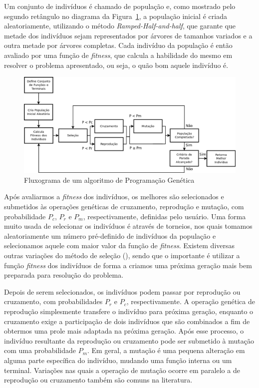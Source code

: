 Um conjunto de indivíduos é chamado de população e, como mostrado pelo segundo retângulo no diagrama da Figura~\ref{fig::gpwf}, a população inicial é criada aleatoriamente, utilizando o método \textit{Ramped-Half-and-half}, que garante que metade dos indivíduos sejam representados por árvores de tamanhos variados e a outra metade por árvores completas.
Cada indivíduo da população é então avaliado por uma função de \textit{fitness}, que calcula a habilidade do mesmo em resolver o problema apresentado, ou seja, o quão bom aquele indivíduo é.

\begin{figure}[t]
\centering
\includegraphics[width=1.1\textwidth]{figures/gpwf_new.png}
\caption{Fluxograma de um algoritmo de Programação Genética}
\label{fig::gpwf}
\end{figure}

Após avaliarmos a \textit{fitness} dos indivíduos, os melhores são selecionados e submetidos às operações genéticas de cruzamento, reprodução e mutação, com probabilidade $P_c$, $P_r$ e $P_m$, respectivamente, definidas pelo usuário.
Uma forma muito usada de selecionar os indivíduos é através de torneios, nos quais tomamos aleatoriamente um número pré-definido de indivíduos da população e selecionamos aquele com maior valor da função de \textit{fitness}. Existem diversas outras variações do método de seleção (\cite{Koza92}), sendo que o importante é utilizar a função \textit{fitness} dos indivíduos de forma a criamos uma próxima geração mais bem preparada para resolução do problema.

Depois de serem selecionados, os indivíduos podem passar por reprodução ou cruzamento, com probabilidades $P_r$ e $P_c$, respectivamente.
A operação genética de reprodução simplesmente transfere o indivíduo para próxima geração, enquanto o cruzamento exige a participação de dois indivíduos que são combinados a fim de obtermos
uma prole mais adaptada na próxima geração.
Após esse processo, o indivíduo resultante da reprodução ou cruzamento pode ser submetido à mutação com uma probabilidade $P_m$.
Em geral, a mutação é uma pequena alteração em alguma parte específica do indivíduo, mudando uma função interna ou um terminal.
Variações nas quais a operação de mutação ocorre em paralelo a de reprodução ou cruzamento também são comuns na literatura.

